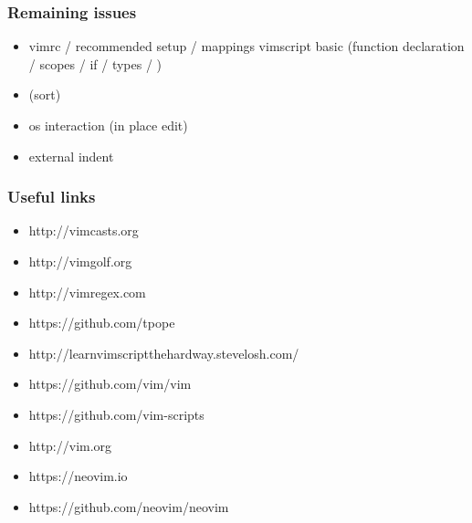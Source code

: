 \documentclass{beamer}
\begin{document}
\begin{frame}
    \frametitle{Remaining issues}
    \begin{itemize}
        \item vimrc / recommended setup / mappings vimscript basic (function declaration / scopes / if / types / )
        \item  (sort)
        \item    os interaction (in place edit)
        \item   external indent
    \end{itemize}
\end{frame}

\begin{frame}
    \frametitle{Useful links}
    \begin{itemize}
        \item http://vimcasts.org
        \item http://vimgolf.org
        \item http://vimregex.com
        \item https://github.com/tpope
        \item http://learnvimscriptthehardway.stevelosh.com/
        \item https://github.com/vim/vim
        \item https://github.com/vim-scripts
        \item http://vim.org
        \item https://neovim.io
        \item https://github.com/neovim/neovim
    \end{itemize}
\end{frame}
\end{document}
